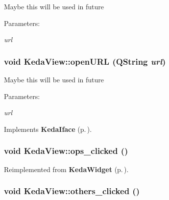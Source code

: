 Maybe this will be used in future \begin{Desc}
\item[Parameters:]
\begin{description}
\item[{\em url}]\end{description}
\end{Desc}
\subsubsection{\setlength{\rightskip}{0pt plus 5cm}void Keda\-View::open\-URL (QString {\em url})\hspace{0.3cm}{\tt  [virtual, slot]}}\label{classKedaView_1d669cfc5a2d59fafee1b0c99df3a957}


Maybe this will be used in future \begin{Desc}
\item[Parameters:]
\begin{description}
\item[{\em url}]\end{description}
\end{Desc}


Implements {\bf Keda\-Iface} {\rm (p.\,\pageref{classKedaIface_3deb991ea51d92a58332714d156f1389})}.
\subsubsection{\setlength{\rightskip}{0pt plus 5cm}void Keda\-View::ops\_\-clicked ()\hspace{0.3cm}{\tt  [virtual, slot]}}\label{classKedaView_aa3cc0f14b4974e79fbef69e0909408b}




Reimplemented from {\bf Keda\-Widget} {\rm (p.\,\pageref{classKedaWidget_aa3cc0f14b4974e79fbef69e0909408b})}.
\subsubsection{\setlength{\rightskip}{0pt plus 5cm}void Keda\-View::others\_\-clicked ()\hspace{0.3cm}{\tt  [virtual, slot]}}\label{classKedaView_7dc5bfb70b7714e6dc7467e68b0531e7}


